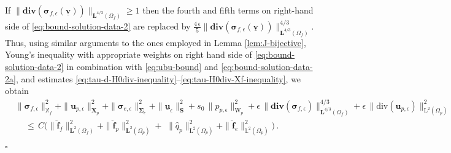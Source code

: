 \documentclass[11pt]{article}
\numberwithin{equation}{section}
\newcommand{\bsi}{{\boldsymbol\sigma}}
\newcommand{\bSigma}{{\boldsymbol\Sigma}}
\newcommand{\ubu}{\underline{\bu}}
\newcommand{\ubv}{\underline{\bv}}
\newcommand{\bv}{{\mathbf{v}}}
\newcommand{\f}{\mathbf{f}}
\newcommand{\bu}{\mathbf{u}}
\newcommand{\0}{{\mathbf{0}}}
\def\bX{\mathbf{X}}
\def\bS{\mathbf{S}}
\newcommand{\bL}{\mathbf{L}}
\newcommand\bbX{\mathbb{X}}
\newcommand\bbL{\mathbb{L}}
\def\L{\mathrm{L}}
\def\W{\mathrm{W}}
\def\rd{\mathrm{d}}
\def\bdiv{\mathbf{div}}
\def\div{\mathrm{div}}
\def\wh{\widehat}
\newenvironment{proof}{\noindent{\it Proof.}}{\hfill$\square$}
\numberwithin{equation}{section}
\begin{document}
\begin{proof}
\medskip
{} If $\|\bdiv(\bsi_{f,\epsilon}(\ubv))\|_{\bL^{4/3}(\Omega_f)} \geq 1$
then the fourth and fifth terms on right-hand side of \eqref{eq:bound-solution-data-2} are replaced by  $\frac{4\,\epsilon}{5}\|\bdiv(\bsi_{f,\epsilon}(\ubv))\|^{4/3}_{\bL^{4/3}(\Omega_f)}$.
Thus, using similar arguments to the ones employed in Lemma \ref{lem:J-bijective}, Young's inequality with appropriate weights on right hand side of \eqref{eq:bound-solution-data-2} in combination with \eqref{eq:ubu-bound} and \eqref{eq:bound-solution-data-2a}, and estimates \eqref{eq:tau-d-H0div-inequality}--\eqref{eq:tau-H0div-Xf-inequality}, we obtain
\begin{align}
& \|\bsi_{f,\epsilon}\|^2_{\bbX_f} 
+ \|\bu_{p,\epsilon}\|^2_{\bX_p}
+ \|\bsi_{e,\epsilon}\|^2_{\bSigma_e}
+ \|\ubu_\epsilon\|^2_\bS 
+ s_0\,\|p_{p,\epsilon}\|^2_{\W_p} 
+ \epsilon\,\|\bdiv(\bsi_{f,\epsilon})\|^{4/3}_{\bL^{4/3}(\Omega_f)}
+ \epsilon\,\|\div(\bu_{p,\epsilon})\|^2_{\L^2(\Omega_p)} 
\nonumber \\
&\quad \,\leq\,  C\big(\|\wh{\f}_f\|^2_{\bL^2(\Omega_f)}  + \|\wh{\f}_p\|^2_{\bL^2(\Omega_p)} + \,\, \|\wh{q}_p\|^2_{\L^2(\Omega_p)}+ \|\wh{\f}_e\|^2_{\bbL^2(\Omega_p)}\big) \,.
\label{eq:bound-solution-data-5}
\end{align}


\end{proof}
\end{document}
